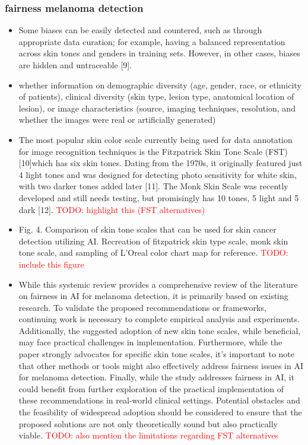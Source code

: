 \documentclass[12pt, a4paper, oneside]{book}   	%
\renewcommand{\todo}[1]{\textcolor{red}{TODO: #1}}
\renewcommand{\paragraph}[1]{%
	\subsubsection*{#1}%
}
\begin{document}
		\paragraph{fairness melanoma detection}
		\begin{itemize}
			\item Some biases can be easily detected and countered, such as through appropriate data curation; for example, having a balanced representation across skin tones and genders in training sets. However, in other cases, biases are hidden and untraceable [9]. \autocite{Montoya_2025}
			\item whether information on demographic diversity (age, gender, race, or ethnicity of patients), clinical diversity (skin type, lesion type, anatomical location of lesion), or image characteristics (source, imaging techniques, resolution, and whether the images were real or artificially generated) \autocite{Montoya_2025}
			\item The most popular skin color scale currently being used for data annotation for image recognition techniques is the Fitzpatrick Skin Tone Scale (FST) [10]which has six skin tones. Dating from the 1970s, it originally featured just 4 light tones and was designed for detecting photo sensitivity for white skin, with two darker tones added later [11]. The Monk Skin Scale was recently developed and still needs testing, but promisingly has 10 tones, 5 light and 5 dark [12].\autocite{Montoya_2025} \todo{highlight this (FST alternatives)}
			\item Fig. 4. Comparison of skin tone scales that can be used for skin cancer detection utilizing AI. Recreation of fitzpatrick skin type scale, monk skin tone scale, and sampling of L’Oreal color chart map for reference. \autocite{Montoya_2025} \todo{include this figure}
			\item While this systemic review provides a comprehensive review of the literature on fairness in AI for melanoma detection, it is primarily based on existing research. To validate the proposed recommendations or frameworks, continuing work is necessary to complete empirical analysis and experiments. Additionally, the suggested adoption of new skin tone scales, while beneficial, may face practical challenges in implementation. Furthermore, while the paper strongly advocates for specific skin tone scales, it’s important to note that other methods or tools might also effectively address fairness issues in AI for melanoma detection. Finally, while the study addresses fairness in AI, it could benefit from further exploration of the practical implementation of these recommendations in real-world clinical settings. Potential obstacles and the feasibility of widespread adoption should be considered to ensure that the proposed solutions are not only theoretically sound but also practically viable. \autocite{Montoya_2025} \todo{also mention the limitations regarding FST alternatives}

\end{itemize}
\end{document}
